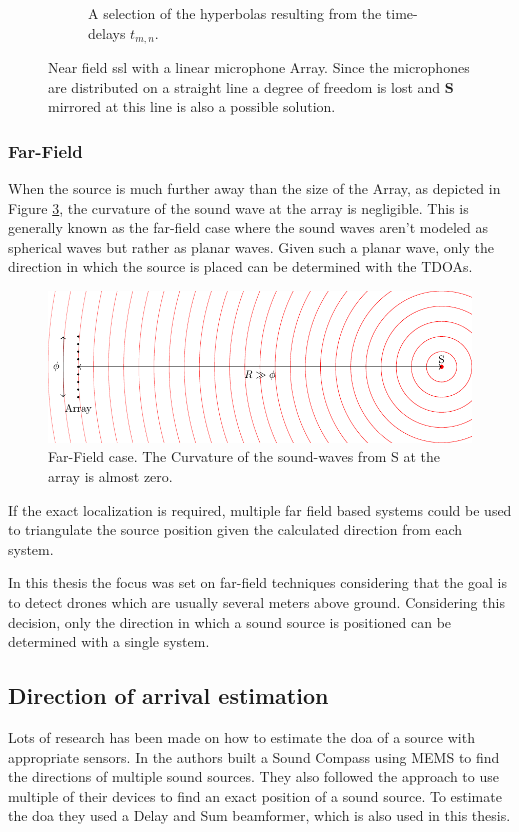 \begin{figure}[h]
\begin{subfigure}[b]{0.45\textwidth}
		\caption{A selection of the hyperbolas resulting from the time-delays $t_{m,n}$.}
		\label{ssl:fig:hyperbola}
	\end{subfigure}
	\caption{Near field \acrshort{ssl} with a linear microphone Array.
		Since the microphones are distributed on a straight line a degree of freedom is lost and
		$\bm{S}$ mirrored at this line is also a possible solution.}
	\label{fig:three graphs}
\end{figure}

\subsubsection{Far-Field}
When the source is much further away than the size of the Array, as depicted
in Figure \ref{ssl:fig:far field}, the curvature of the sound wave at the array is negligible.
This is generally known as the far-field case where the sound waves aren't 
modeled as spherical waves but rather as planar waves.
Given such a planar wave, only the direction in which the source is placed can be determined with the TDOAs.

\begin{figure}[h]
	\centering
	\includegraphics[]{FarField.pdf}
	\caption{Far-Field case. The Curvature of the sound-waves from S at the array
		is almost zero.}
	\label{ssl:fig:far field}
\end{figure}

If the exact localization is required, multiple far field based systems could be 
used to triangulate the source position given the calculated direction from each system.

In this thesis the focus was set on far-field techniques considering that the
goal is to detect drones which are usually several meters above ground.
Considering this decision, only the direction in which a sound source is positioned
can be determined with a single system.
\newpage
\subsection{Direction of arrival estimation}
Lots of research has been made on how to estimate the \acrfull*{doa} of a source
with appropriate sensors.
In \cite{s140201918} the authors built a Sound Compass
using MEMS to find the directions of multiple sound sources.
They also followed the approach to use multiple of their devices to 
find an exact position of a sound source.
To estimate the \acrshort*{doa} they used a Delay and Sum beamformer,
which is also used in this thesis.

